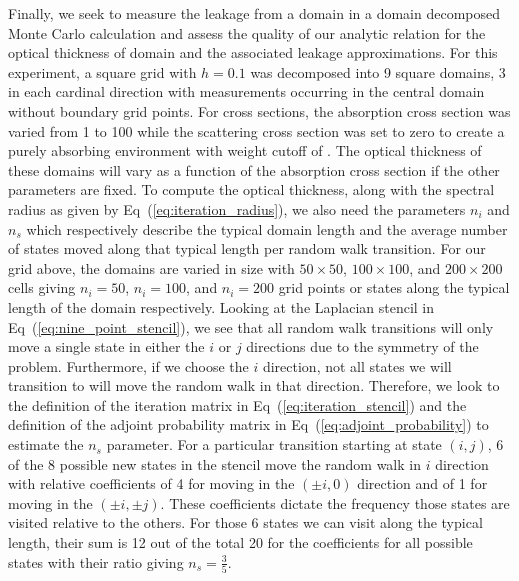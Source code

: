 \documentclass[preprint,11pt]{elsarticle}
\begin{document}
Finally, we seek to measure the leakage from a domain in a domain decomposed
Monte Carlo calculation and assess the quality of our analytic relation for
the optical thickness of domain and the associated leakage approximations. For
this experiment, a square grid with $h=0.1$ was decomposed into 9 square
domains, 3 in each cardinal direction with measurements occurring in the
central domain without boundary grid points. For cross sections, the
absorption cross section was varied from 1 to 100 while the scattering cross
section was set to zero to create a purely absorbing environment with weight
cutoff of . The optical thickness of these domains will vary as a
function of the absorption cross section if the other parameters are fixed. To
compute the optical thickness, along with the spectral radius as given by
Eq~(\ref{eq:iteration_radius}), we also need the parameters $n_i$ and $n_s$
which respectively describe the typical domain length and the average number
of states moved along that typical length per random walk transition. For our
grid above, the domains are varied in size with $50 \times 50$, $100 \times
100$, and $200 \times 200$ cells giving $n_i=50$, $n_i=100$, and $n_i=200$
grid points or states along the typical length of the domain
respectively. Looking at the Laplacian stencil in
Eq~(\ref{eq:nine_point_stencil}), we see that all random walk transitions will
only move a single state in either the $i$ or $j$ directions due to the
symmetry of the problem. Furthermore, if we choose the $i$ direction, not all
states we will transition to will move the random walk in that
direction. Therefore, we look to the definition of the iteration matrix in
Eq~(\ref{eq:iteration_stencil}) and the definition of the adjoint probability
matrix in Eq~(\ref{eq:adjoint_probability}) to estimate the $n_s$
parameter. For a particular transition starting at state $(i,j)$, 6 of the 8
possible new states in the stencil move the random walk in $i$ direction with
relative coefficients of 4 for moving in the $(\pm i,0)$ direction and of 1
for moving in the $(\pm i,\pm j)$. These coefficients dictate the frequency
those states are visited relative to the others. For those 6 states we can
visit along the typical length, their sum is 12 out of the total 20 for the
coefficients for all possible states with their ratio giving $n_s =
\frac{3}{5}$.
\end{document}
